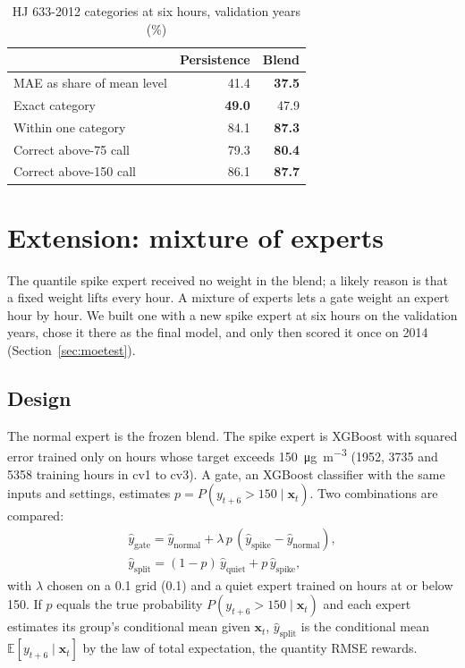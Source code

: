 \documentclass[conference]{IEEEtran}
\newcommand{\ugm}{\si{\micro\gram\per\cubic\metre}}
\begin{document}
\begin{table}[!htb]
\centering
\caption{HJ 633-2012 categories at six hours, validation years (\%)}
\label{tab:aqi}
\begin{tabular}{@{}lrr@{}}
\toprule
 & Persistence & Blend \\
\midrule
MAE as share of mean level & 41.4 & \textbf{37.5} \\
Exact category & \textbf{49.0} & 47.9 \\
Within one category & 84.1 & \textbf{87.3} \\
Correct above-75 call & 79.3 & \textbf{80.4} \\
Correct above-150 call & 86.1 & \textbf{87.7} \\
\bottomrule
\end{tabular}
\end{table}

\section{Extension: mixture of experts}
\label{sec:moe}
The quantile spike expert received no weight in the blend; a likely reason is that a fixed weight lifts every hour. A mixture of experts \cite{jacobs1991} lets a gate weight an expert hour by hour. We built one with a new spike expert at six hours on the validation years, chose it there as the final model, and only then scored it once on 2014 (Section~\ref{sec:moetest}).

\subsection{Design}
The normal expert is the frozen blend. The spike expert is XGBoost with squared error trained only on hours whose target exceeds 150~\ugm{} (\num{1952}, \num{3735} and \num{5358} training hours in cv1 to cv3). A gate, an XGBoost classifier with the same inputs and settings, estimates $p = P(y_{t+6} > 150 \mid \mathbf{x}_t)$. Two combinations are compared:
\begin{gather}
\hat{y}_{\text{gate}} = \hat{y}_{\text{normal}} + \lambda\,p\,(\hat{y}_{\text{spike}} - \hat{y}_{\text{normal}}), \\
\hat{y}_{\text{split}} = (1-p)\,\hat{y}_{\text{quiet}} + p\,\hat{y}_{\text{spike}},
\end{gather}
with $\lambda$ chosen on a 0.1 grid (0.1) and a quiet expert trained on hours at or below 150. If $p$ equals the true probability $P(y_{t+6} > 150 \mid \mathbf{x}_t)$ and each expert estimates its group's conditional mean given $\mathbf{x}_t$, $\hat{y}_{\text{split}}$ is the conditional mean $\mathbb{E}[y_{t+6} \mid \mathbf{x}_t]$ by the law of total expectation, the quantity RMSE rewards.
\end{document}
